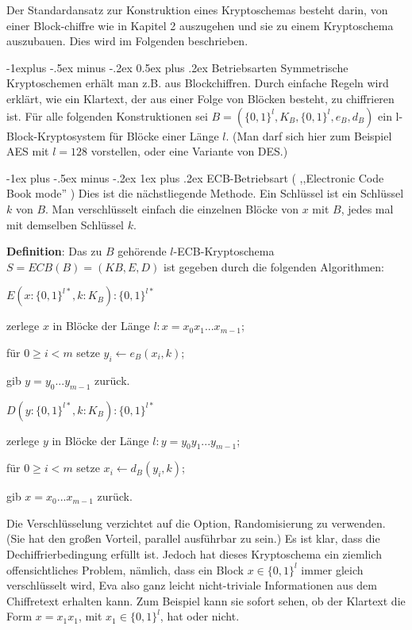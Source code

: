 \documentclass[a4paper]{article}
\makeatletter
\renewcommand{\subsection}{\@startsection{subsection}{2}{0mm}%
 {-1explus -.5ex minus -.2ex}%
 {0.5ex plus .2ex}%
 {\normalfont\normalsize\bfseries}}
\renewcommand{\subsubsection}{\@startsection{subsubsection}{3}{0mm}%
 {-1ex plus -.5ex minus -.2ex}%
 {1ex plus .2ex}%
 {\normalfont\small\bfseries}}
\makeatother
\begin{document}
\begin{multicols}{3}
    Der Standardansatz zur Konstruktion eines Kryptoschemas besteht darin, von einer Block-chiffre wie in Kapitel 2 auszugehen und sie zu einem Kryptoschema auszubauen. Dies wird im Folgenden beschrieben.

    \subsection{Betriebsarten}
    Symmetrische Kryptoschemen erhält man z.B. aus Blockchiffren. Durch einfache Regeln wird erklärt, wie ein Klartext, der aus einer Folge von Blöcken besteht, zu chiffrieren ist. Für alle folgenden Konstruktionen sei $B=(\{0,1\}^l,K_B,\{0,1\}^l,e_B,d_B)$ ein l-Block-Kryptosystem für Blöcke einer Länge $l$. (Man darf sich hier zum Beispiel AES mit $l=128$ vorstellen, oder eine Variante von DES.)

    \subsubsection{ECB-Betriebsart ( ,,Electronic Code Book mode'' )}
    Dies ist die nächstliegende Methode. Ein Schlüssel ist ein Schlüssel $k$ von $B$. Man verschlüsselt einfach die einzelnen Blöcke von $x$ mit $B$, jedes mal mit demselben Schlüssel $k$.

    \textbf{Definition}: Das zu $B$ gehörende $l$-ECB-Kryptoschema $S=ECB(B)=(KB,E,D)$ ist gegeben durch die folgenden Algorithmen:
    \begin{itemize*}
        \item $E(x:\{0,1\}^{l*},k:K_B) :\{0,1\}^{l*}$
        \item zerlege $x$ in Blöcke der Länge $l:x=x_0 x_1 ...x_{m-1}$;
        \item für $0\geq i < m$ setze $y_i\leftarrow e_B(x_i,k)$;
        \item gib $y=y_0 ...y_{m-1}$ zurück.
        \item $D(y:\{0,1\}^{l*},k:K_B) :\{0,1\}^{l*}$
        \item zerlege $y$ in Blöcke der Länge $l:y=y_0 y_1 ...y_{m-1}$;
        \item für $0\geq i < m$ setze $x_i\leftarrow d_B(y_i,k)$;
        \item gib $x=x_0 ...x_{m-1}$ zurück.
    \end{itemize*}

    Die Verschlüsselung verzichtet auf die Option, Randomisierung zu verwenden. (Sie hat den großen Vorteil, parallel ausführbar zu sein.) Es ist klar, dass die Dechiffrierbedingung erfüllt ist. Jedoch hat dieses Kryptoschema ein ziemlich offensichtliches Problem, nämlich,
    dass ein Block $x\in\{0,1\}^l$ immer gleich verschlüsselt wird, Eva also ganz leicht nicht-triviale Informationen aus dem Chiffretext erhalten kann. Zum Beispiel kann sie sofort sehen, ob der Klartext die Form $x=x_1 x_1$, mit $x_1\in\{0,1\}^l$, hat oder nicht.


\end{multicols}
\end{document}
